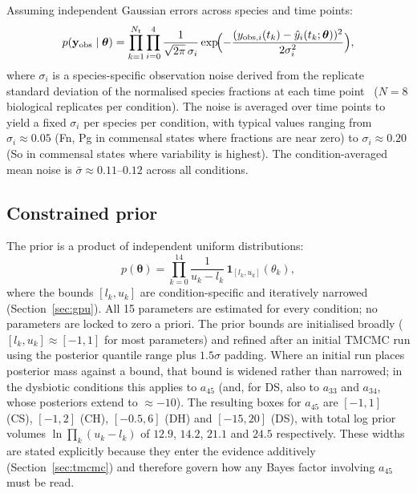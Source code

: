 \documentclass[11pt,a4paper]{article}
\newcommand{\btheta}{\boldsymbol{\theta}}
\newcommand{\yobs}{\mathbf{y}_{\mathrm{obs}}}
\begin{document}
Assuming independent Gaussian errors across species and time points:
\begin{equation}
p(\yobs\mid\btheta)
= \prod_{k=1}^{N_t}\prod_{i=0}^{4}
\frac{1}{\sqrt{2\pi}\,\sigma_{i}}
\exp\!\Bigl(-\frac{(y_{\mathrm{obs},i}(t_k)-\hat{y}_i(t_k;\btheta))^2}{2\sigma_{i}^2}\Bigr),
\label{eq:likelihood}
\end{equation}
where $\sigma_{i}$ is a species-specific observation noise derived from the replicate standard deviation of the normalised species fractions at each time point~\cite{Heine2025PeriImplant} ($N=8$ biological replicates per condition).
The noise is averaged over time points to yield a fixed $\sigma_i$ per species per condition, with typical values ranging from $\sigma_i\approx0.05$ (Fn, Pg in commensal states where fractions are near zero) to $\sigma_i\approx0.20$ (So in commensal states where variability is highest).
The condition-averaged mean noise is $\bar{\sigma}\approx0.11$--$0.12$ across all conditions.

\subsection{Constrained prior}
\label{sec:prior}

The prior is a product of independent uniform distributions:
\begin{equation}
p(\btheta) = \prod_{k=0}^{14} \frac{1}{u_k-l_k}\,\mathbf{1}_{[l_k,u_k]}(\theta_k),
\label{eq:prior}
\end{equation}
where the bounds $[l_k,u_k]$ are condition-specific and iteratively narrowed (Section~\ref{sec:gpu}).
All 15 parameters are estimated for every condition; no parameters are locked to zero a priori.
The prior bounds are initialised broadly ($[l_k,u_k]\approx[-1,1]$ for most parameters) and refined after an initial TMCMC run using the posterior quantile range plus $1.5\sigma$ padding.
Where an initial run places posterior mass against a bound, that bound is widened rather than narrowed; in the dysbiotic conditions this applies to $a_{45}$ (and, for DS, also to $a_{33}$ and $a_{34}$, whose posteriors extend to $\approx-10$).
The resulting boxes for $a_{45}$ are $[-1,1]$ (CS), $[-1,2]$ (CH), $[-0.5,6]$ (DH) and $[-15,20]$ (DS), with total log prior volumes $\ln\prod_k(u_k-l_k)$ of $12.9$, $14.2$, $21.1$ and $24.5$ respectively.
These widths are stated explicitly because they enter the evidence additively (Section~\ref{sec:tmcmc}) and therefore govern how any Bayes factor involving $a_{45}$ must be read.
\end{document}
